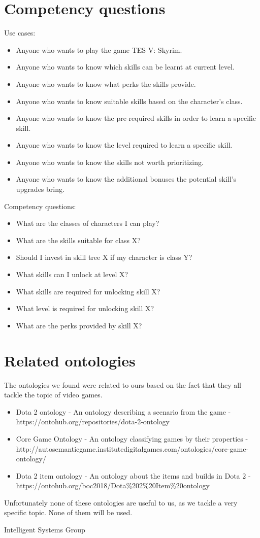 \documentclass[a4paper,12pt]{report}
\begin{document}
\section{Competency questions}
Use cases:
\begin{itemize}
 \item Anyone who wants to play the game TES V: Skyrim.
 \item Anyone who wants to know which skills can be learnt at current level.
 \item Anyone who wants to know what perks the skills provide.
 \item Anyone who wants to know suitable skills based on the character's class.
 \item Anyone who wants to know the pre-required skills in order to learn a specific skill.
 \item Anyone who wants to know the level required to learn a specific skill.
 \item Anyone who wants to know the skills not worth prioritizing. 
 \item Anyone who wants to know the additional bonuses the potential skill's upgrades bring. 
\end{itemize}
\hfill \break
Competency questions:
\begin{itemize}
  \item What are the classes of characters I can play?
  \item What are the skills suitable for class X?
  \item Should I invest in skill tree X if my character is class Y?
  \item What skills can I unlock at level X?
  \item What skills are required for unlocking skill X?
  \item What level is required for unlocking skill X?
  \item What are the perks provided by skill X?
\end{itemize}


\clearpage
\section{Related ontologies}
The ontologies we found were related to ours based on the fact that they all tackle the topic of video games.
\begin{itemize}
    \item Dota 2 ontology - An ontology describing a scenario from the game - https://ontohub.org/repositories/dota-2-ontology
    \item Core Game Ontology - An ontology classifying games by their properties - http://autosemanticgame.institutedigitalgames.com/ontologies/core-game-ontology/
    \item Dota 2 item ontology - An ontology about the items and builds in Dota 2 - https://ontohub.org/boc2018/Dota\%202\%20Item\%20ontology
\end{itemize}

Unfortunately none of these ontologies are useful to us, as we tackle a very specific topic. None of them will be used.


\vspace{2cm}
\begin{center}
Intelligent Systems Group\\
\end{center}
\end{document}
